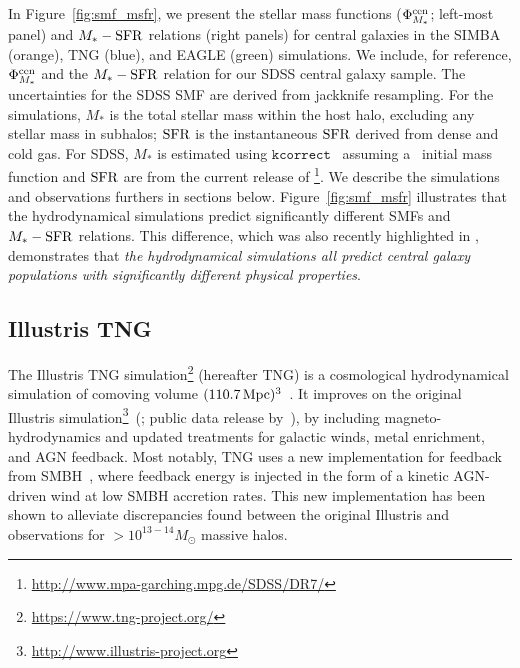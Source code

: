In Figure~\ref{fig:smf_msfr}, we present the stellar mass functions ($\Phi^{\rm
cen}_{M_*}$; left-most panel) and $M_*-{\rm SFR}$ relations (right panels) for
central galaxies in the SIMBA (orange), TNG (blue), and EAGLE (green) simulations. 
We include, for reference, $\Phi^{\rm cen}_{M_*}$ and the $M_*-{\rm SFR}$ relation for
our SDSS central galaxy sample. The uncertainties for the SDSS SMF are derived 
from jackknife resampling. For the simulations, $M_*$ is the total stellar mass 
within the host halo, excluding any stellar mass in subhalos; ${\rm SFR}$ is the
instantaneous ${\rm SFR}$ derived from dense and cold gas. For SDSS, $M_*$ is
estimated using $\mathtt{kcorrect}$~\citep{blanton2007a} 
assuming a~\cite{chabrier2003} initial mass function and ${\rm SFR}$ are from the
current release of
\cite{brinchmann2004}\footnote{\url{http://www.mpa-garching.mpg.de/SDSS/DR7/}}.
We describe the simulations and observations furthers in sections below. 
Figure~\ref{fig:smf_msfr} illustrates that the hydrodynamical simulations
predict significantly different SMFs and $M_*-{\rm SFR}$ relations. 
This difference, which was also recently highlighted in \cite{hahn2019c}, 
demonstrates that \emph{the hydrodynamical simulations all predict central 
galaxy populations with significantly different physical properties}.

\subsection{Illustris TNG} \label{sec:tng}
The Illustris TNG simulation\footnote{\url{https://www.tng-project.org/}}
(hereafter TNG) is a cosmological hydrodynamical simulation of comoving 
volume $(110.7\,{\rm Mpc})^3$~\citep{nelson2018, pillepich2018, springel2018}. It
improves on the original Illustris
simulation\footnote{\url{http://www.illustris-project.org}}~(\citealt{vogelsberger2014, genel2014};
public data release by~\citealt{nelson2015}), by including
magneto-hydrodynamics and updated treatments for galactic winds, metal
enrichment, and AGN feedback. Most notably, TNG uses a new implementation for
feedback from SMBH~\citep{weinberger2018}, where feedback energy is injected in
the form of a kinetic AGN-driven wind at low SMBH accretion rates. This new
implementation has been shown to alleviate discrepancies found between the
original Illustris and observations for $> 10^{13-14} M_\odot$ massive halos. 

